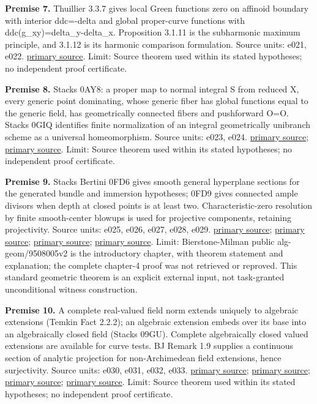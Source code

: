 \documentclass[
  10pt,
]{article}
\begin{document}
\textbf{Premise 7.} Thuillier 3.3.7 gives local Green functions zero on
affinoid boundary with interior ddc=-delta and global proper-curve
functions with ddc(g\_xy)=delta\_y-delta\_x. Proposition 3.1.11 is the
subharmonic maximum principle, and 3.1.12 is its harmonic comparison
formulation. Source units: e021, e022.
\href{https://theses.hal.science/tel-00010990v1/document}{primary
source}. Limit: Source theorem used within its stated hypotheses; no
independent proof certificate.

\textbf{Premise 8.} Stacks 0AY8: a proper map to normal integral S from
reduced X, every generic point dominating, whose generic fiber has
global functions equal to the generic field, has geometrically connected
fibers and pushforward O=O. Stacks 0GIQ identifies finite normalization
of an integral geometrically unibranch scheme as a universal
homeomorphism. Source units: e023, e024.
\href{https://stacks.math.columbia.edu/tag/0AY8}{primary source};
\href{https://stacks.math.columbia.edu/tag/0GIQ}{primary source}. Limit:
Source theorem used within its stated hypotheses; no independent proof
certificate.

\textbf{Premise 9.} Stacks Bertini 0FD6 gives smooth general hyperplane
sections for the generated bundle and immersion hypotheses; 0FD9 gives
connected ample divisors when depth at closed points is at least two.
Characteristic-zero resolution by finite smooth-center blowups is used
for projective components, retaining projectivity. Source units: e025,
e026, e027, e028, e029.
\href{https://stacks.math.columbia.edu/tag/0FD6}{primary source};
\href{https://stacks.math.columbia.edu/tag/0FD9}{primary source};
\href{https://arxiv.org/pdf/alg-geom/9508005}{primary source};
\href{https://arxiv.org/abs/alg-geom/9508005}{primary source}. Limit:
Bierstone-Milman public alg-geom/9508005v2 is the introductory chapter,
with theorem statement and explanation; the complete chapter-4 proof was
not retrieved or reproved. This standard geometric theorem is an
explicit external input, not task-granted unconditional witness
construction.

\textbf{Premise 10.} A complete real-valued field norm extends uniquely
to algebraic extensions (Temkin Fact 2.2.2); an algebraic extension
embeds over its base into an algebraically closed field (Stacks 09GU).
Complete algebraically closed valued extensions are available for curve
tests. BJ Remark 1.9 supplies a continuous section of analytic
projection for non-Archimedean field extensions, hence surjectivity.
Source units: e030, e031, e032, e033.
\href{https://arxiv.org/pdf/1801.08229v4}{primary source};
\href{https://cml.centre-mersenne.org/item/10.1142/S1793744212500077.pdf}{primary
source};
\href{https://berkovich-2010.imj-prg.fr/lecture-notes/Temkin-lecture-notes.pdf}{primary
source}; \href{https://stacks.math.columbia.edu/tag/09GU}{primary
source}. Limit: Source theorem used within its stated hypotheses; no
independent proof certificate.
\end{document}
